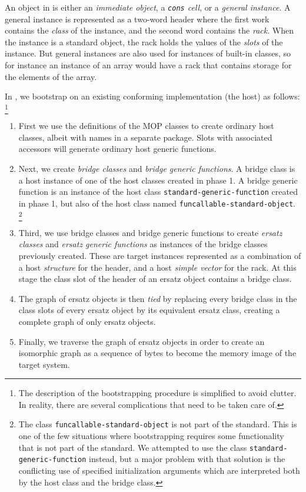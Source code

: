 An object in \sicl{} is either an \emph{immediate object}, a
\emph{\texttt{cons} cell}, or a \emph{general instance}.  A general
instance is represented as a two-word header where the first work
contains the \emph{class} of the instance, and the second word
contains the \emph{rack}.  When the instance is a standard object, the
rack holds the values of the \emph{slots} of the instance.  But
general instances are also used for instances of built-in classes, so
for instance an instance of an array would have a rack that contains
storage for the elements of the array. 

In \sicl{}, we bootstrap \clos{} on an existing conforming \cl{}
implementation (the host) as follows:%
\footnote{The description of the bootstrapping procedure is simplified
  to avoid clutter.  In reality, there are several complications that
  need to be taken care of.}

\begin{enumerate}
\item First we use the definitions of the MOP classes to create
  ordinary host classes, albeit with names in a separate package.
  Slots with associated accessors will generate ordinary host generic
  functions. 
\item Next, we create \emph{bridge classes} and \emph{bridge generic
  functions}.  A bridge class is a host instance of one of the host
  classes created in phase 1.  A bridge generic function is an
  instance of the host class \texttt{standard-generic-function}
  created in phase 1, but also of the host class named
  \texttt{funcallable-standard-object}.%
  \footnote{The class \texttt{funcallable-standard-object} is not part
    of the \cl{} standard.  This is one of the few situations where
    bootstrapping \sicl{} requires some functionality that is not part
    of the standard.  We attempted to use the class
    \texttt{standard-generic-function} instead, but a major problem
    with that solution is the conflicting use of specified
    initialization arguments which are interpreted both by the host
    class and the bridge class.}
\item Third, we use bridge classes and bridge generic functions to
  create \emph{ersatz classes} and \emph{ersatz generic functions} as
  instances of the bridge classes previously created.  These are
  target instances represented as a combination of a host
  \emph{structure} for the header, and a host \emph{simple vector} for
  the rack.  At this stage the class slot of the header of an ersatz
  object contains a bridge class.
\item The graph of ersatz objects is then \emph{tied} by
  replacing every bridge class in the class slots of every ersatz
  object by its equivalent ersatz class, creating a complete graph of
  only ersatz objects. 
\item Finally, we traverse the graph of ersatz objects in order to
  create an isomorphic graph as a sequence of bytes to become the
  memory image of the target system.
\end{enumerate}


